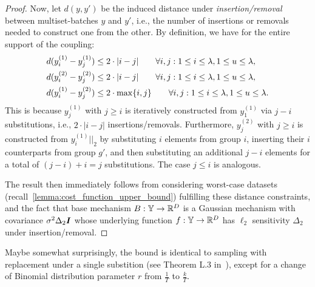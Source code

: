 \begin{proof}
    Now, let $d(y, y')$ be the induced distance under \emph{insertion/removal} between multiset-batches $y$ and $y'$, i.e., the number of insertions or removals needed to construct one from the other. By definition, we have for the entire support of the coupling:
    \begin{align*}
        & d(y^{(1)}_i - y^{(1)}_j) \leq 2 \cdot | i - j |   \qquad \forall i,j : 1 \leq i  \leq \lambda, 1 \leq u \leq \lambda, \\
        & d(y^{(2)}_i - y^{(2)}_j) \leq 2 \cdot | i - j |   \qquad \forall i,j : 1 \leq i  \leq \lambda, 1 \leq u \leq \lambda, \\
        & d(y^{(1)}_i - y^{(2)}_j) \leq 2 \cdot \max \{ i, j \}   \qquad \forall i,j : 1 \leq i  \leq \lambda, 1 \leq u \leq \lambda.
    \end{align*}
    This is because $y^{(1)}_j$ with $j \geq i$ is iteratively constructed from $y^{(1)}_1$ via $j - i$ substitutions, i.e., $2 \cdot |i-j|$ insertions/removals.
    Furthermore, $y^{(2)}_j$ with $j \geq i$ is constructed from $y^{(1)}_i||_2$ by substituting $i$ elements from group $i$, inserting their $i$ counterparts from group $g'$, and then substituting an additional $j - i$ elements for a total of $(j-i) + i = j$ substitutions.
    The case $j \leq i$ is analogous.

    The result then immediately follows from considering worst-case datasets
    (recall~\cref{lemma:cost_function_upper_bound}) fulfilling these distance constraints,
    and the fact that base mechanism $B : {\mathbb{Y}} \rightarrow {\mathbb{R}}^D$
    is a Gaussian mechanism with covariance $\sigma^2 \Delta_2 {\bm{I}}$ whose underlying function $f : {\mathbb{Y}} \rightarrow {\mathbb{R}}^D$ has
    $\ell_2$ sensitivity $\Delta_2$ under insertion/removal.
\end{proof}
Maybe somewhat surprisingly, the bound is identical to sampling with replacement under a single substition (see Theorem L.3 in~\cite{schuchardt2024unified}), except for a change of Binomial distribution parameter $r$ from $\frac{1}{T}$ to $\frac{k}{T}$. 
    
